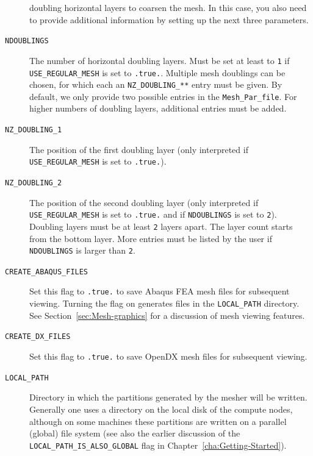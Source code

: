 \begin{description}
doubling horizontal layers to coarsen the mesh. In this case, you
also need to provide additional information by setting up the next
three parameters.
%
\item [{\texttt{NDOUBLINGS}}] The number of horizontal doubling layers.
Must be set at least to \texttt{1} if \texttt{USE\_REGULAR\_MESH} is set to \texttt{.true.}.
Multiple mesh doublings can be chosen, for which each an \texttt{NZ\_DOUBLING\_**} entry must be given.
By default, we only provide two possible entries in the \texttt{Mesh\_Par\_file}.
For higher numbers of doubling layers, additional entries must be added.
\item [{\texttt{NZ\_DOUBLING\_1}}] The position of the first doubling layer
(only interpreted if \texttt{USE\_REGULAR\_MESH} is set to \texttt{.true.}).
\item [{\texttt{NZ\_DOUBLING\_2}}] The position of the second doubling
layer (only interpreted if \texttt{USE\_REGULAR\_MESH} is set to \texttt{.true.}
and if \texttt{NDOUBLINGS} is set to \texttt{2}). Doubling layers must be at least \texttt{2} layers apart.
The layer count starts from the bottom layer.
More entries must be listed by the user if \texttt{NDOUBLINGS} is larger than \texttt{2}.
\item [{\texttt{CREATE\_ABAQUS\_FILES}}] Set this flag to \texttt{.true.}
to save Abaqus FEA  mesh files
for subsequent viewing. Turning the flag on generates files in the
\texttt{LOCAL\_PATH} directory. See Section~\ref{sec:Mesh-graphics}
for a discussion of mesh viewing features.
\item [{\texttt{CREATE\_DX\_FILES}}] Set this flag to \texttt{.true.} to
save OpenDX  mesh files for subsequent
viewing.
\item [{\texttt{LOCAL\_PATH}}] Directory in which the partitions generated
by the mesher will be written. Generally one uses a directory on the
local disk of the compute nodes, although on some machines these partitions
are written on a parallel (global) file system (see also the earlier
discussion of the \texttt{LOCAL\_PATH\_IS\_ALSO\_GLOBAL} flag in Chapter~\ref{cha:Getting-Started}).


\end{description}
